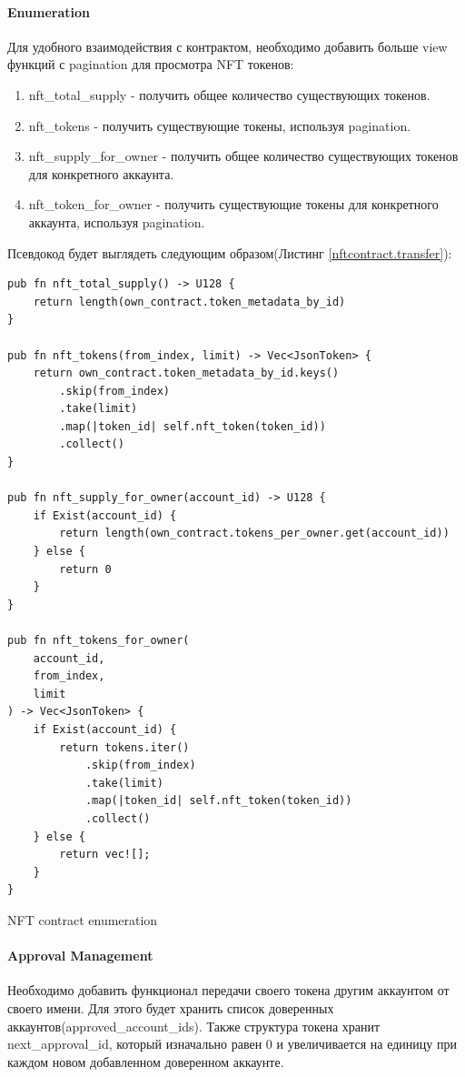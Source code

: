 \paragraph{Enumeration}
Для удобного взаимодействия с контрактом, необходимо добавить больше view функций с pagination для просмотра NFT токенов\cite{enumstandard}:
\begin{enumerate}
\item nft\_total\_supply - получить общее количество существующих токенов.
\item nft\_tokens - получить существующие токены, используя pagination.
\item nft\_supply\_for\_owner - получить общее количество существующих токенов для конкретного аккаунта.
\item nft\_token\_for\_owner - получить существующие токены для конкретного аккаунта, используя pagination.
\end{enumerate}

Псевдокод будет выглядеть следующим образом(Листинг {\color{blue}\ref{nftcontract.transfer}}):

\begin{listing}
\begin{verbatim}
pub fn nft_total_supply() -> U128 {
    return length(own_contract.token_metadata_by_id)
}

pub fn nft_tokens(from_index, limit) -> Vec<JsonToken> {
    return own_contract.token_metadata_by_id.keys()
        .skip(from_index)
        .take(limit)
        .map(|token_id| self.nft_token(token_id))
        .collect()
}

pub fn nft_supply_for_owner(account_id) -> U128 {
    if Exist(account_id) {
        return length(own_contract.tokens_per_owner.get(account_id))
    } else {
        return 0
    }
}

pub fn nft_tokens_for_owner(
    account_id,
    from_index,
    limit
) -> Vec<JsonToken> {
    if Exist(account_id) {
        return tokens.iter()
            .skip(from_index)
            .take(limit)
            .map(|token_id| self.nft_token(token_id))
            .collect()
    } else {
        return vec![];
    }
}
\end{verbatim}
\caption{NFT contract enumeration}
\label{nftcontract.transfer}
\end{listing}

\paragraph{Approval Management}
Необходимо добавить функционал передачи своего токена другим аккаунтом от своего имени\cite{approvalstandard}. Для этого будет хранить список доверенных аккаунтов(approved\_account\_ids).
Также структура токена хранит next\_approval\_id, который изначально равен 0 и увеличивается на единицу при каждом новом добавленном доверенном аккаунте.


